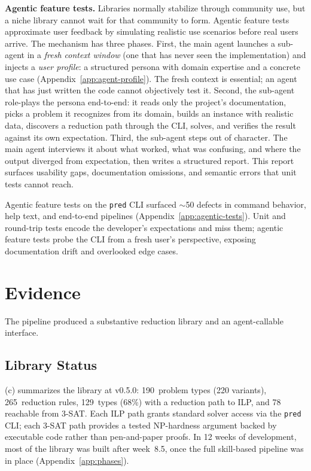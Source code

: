 \documentclass{article}
\begin{document}
\textbf{Agentic feature tests.}
Libraries normally stabilize through community use, but a niche library cannot wait for that community to form.
Agentic feature tests approximate user feedback by simulating realistic use scenarios before real users arrive.
The mechanism has three phases.
First, the main agent launches a sub-agent in a \emph{fresh context window} (one that has never seen the implementation) and injects a \emph{user profile}: a structured persona with domain expertise and a concrete use case (Appendix~\ref{app:agent-profile}).
The fresh context is essential; an agent that has just written the code cannot objectively test it.
Second, the sub-agent role-plays the persona end-to-end: it reads only the project's documentation, picks a problem it recognizes from its domain, builds an instance with realistic data, discovers a reduction path through the CLI, solves, and verifies the result against its own expectation.
Third, the sub-agent steps out of character.
The main agent interviews it about what worked, what was confusing, and where the output diverged from expectation, then writes a structured report.
This report surfaces usability gaps, documentation omissions, and semantic errors that unit tests cannot reach.

Agentic feature tests on the \texttt{pred} CLI surfaced $\sim$50 defects in command behavior, help text, and end-to-end pipelines (Appendix~\ref{app:agentic-tests}). Unit and round-trip tests encode the developer's expectations and miss them; agentic feature tests probe the CLI from a fresh user's perspective, exposing documentation drift and overlooked edge cases.
\section{Evidence}\label{sec:evidence}

The pipeline produced a substantive reduction library and an agent-callable interface. 

\subsection{Library Status}

(c) summarizes the library at v0.5.0: 190~problem types (220 variants), 265~reduction rules, 129~types (68\%) with a reduction path to ILP, and 78 reachable from 3-SAT.
Each ILP path grants standard solver access via the \texttt{pred} CLI; each 3-SAT path provides a tested NP-hardness argument backed by executable code rather than pen-and-paper proofs.
In 12 weeks of development, most of the library was built after week~8.5, once the full skill-based pipeline was in place (Appendix~\ref{app:phases}).
\end{document}
